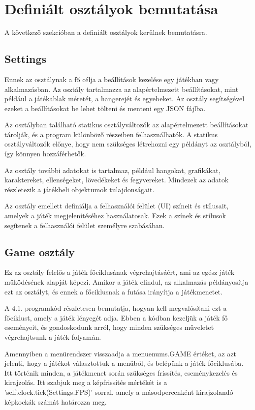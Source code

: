 \section{Definiált osztályok bemutatása}
A következő szekcióban a definiált osztályok kerülnek bemutatásra.


\subsection{Settings}
Ennek az osztálynak a fő célja a beállítások kezelése egy játékban vagy alkalmazásban. Az osztály tartalmazza az alapértelmezett beállításokat, mint például a játékablak méretét, a hangerejét és egyebeket. Az osztály segítségével ezeket a beállításokat be lehet tölteni és menteni egy JSON fájlba.

Az osztályban található statikus osztályváltozók az alapértelmezett beállításokat tárolják, és a program különböző részeiben felhasználhatók. A statikus osztályváltozók előnye, hogy nem szükséges létrehozni egy példányt az osztályból, így könnyen hozzáférhetők.

Az osztály további adatokat is tartalmaz, például hangokat, grafikákat, karaktereket, ellenségeket, lövedékeket és fegyvereket. Mindezek az adatok részletezik a játékbeli objektumok tulajdonságait.

Az osztály emellett definiálja a felhasználói felület (UI) színeit és stílusait, amelyek a játék megjelenítéséhez használatosak. Ezek a színek és stílusok segítenek a felhasználói felület személyre szabásában.


\subsection{Game osztály}
Ez az osztály felelős a játék főciklusának végrehajtásáért, ami az egész játék működésének alapját képezi. Amikor a játék elindul, az alkalmazás példányosítja ezt az osztályt, és ennek a főciklusnak a futása irányítja a játékmenetet.

A 4.1. programkód részletesen bemutatja, hogyan kell megvalósítani ezt a főciklust, amely a játék lényegét adja. Ebben a kódban kezeljük a játék fő eseményeit, és gondoskodunk arról, hogy minden szükséges műveletet végrehajtsunk a játék folyamán.

Amennyiben a menürendszer visszaadja a menuenums.GAME értéket, az azt jelenti, hogy a játékot választottuk a menüből, és belépünk a játék főciklusába. Itt történik minden, a játékmenet során szükséges frissítés, eseménykezelés és kirajzolás. Itt szabjuk meg a képfrissítés mértékét is a 'self.clock.tick(Settings.FPS)' sorral, amely a másodpercenként kirajzolandó képkockák számát határozza meg.

